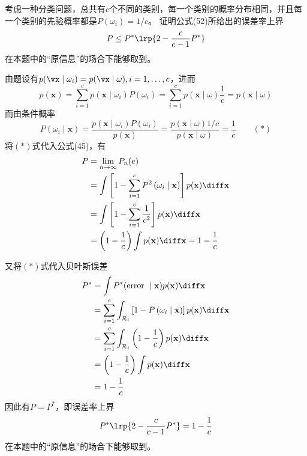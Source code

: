 \documentclass[reportComp]{thesis}
\begin{document}
\begin{question}[\textsection 4 Q17]
考虑一种分类问题，总共有$c$个不同的类别，每一个类别的概率分布相同，并且每一个类别的先验概率都是$P(\omega_i)=1/c$。
证明公式(52)所给出的误差率上界
\[P\leq P^*\lrp{2-\frac{c}{c-1}P^*}\]
在本题中的“原信息”的场合下能够取到。
\end{question}
\begin{answer}
由题设有$p(\vx\mid\omega_i)=p(\vx\mid\omega),i=1,\ldots,c$，进而
\[p(\mathbf{x})=\sum_{i=1}^{c} p\left(\mathbf{x} \mid \omega_{i}\right) P\left(\omega_{i}\right)=\sum_{i=1}^{c} p(\mathbf{x} \mid \omega) \frac{1}{c}=p(\mathbf{x} \mid \omega)\]
而由条件概率
\[P\left(\omega_{i} \mid \mathbf{x}\right)=\frac{p\left(\mathbf{x} \mid \omega_{i}\right) P\left(\omega_{i}\right)}{p(\mathbf{x})}=\frac{p(\mathbf{x} \mid \omega) 1 / c}{p(\mathbf{x} \mid \omega)}=\frac{1}{c}\qquad(*)\]
将$(*)$式代入公式(45)，有
\[\begin{aligned}
P &=\lim _{n \rightarrow \infty} P_{n}(e) \\
&=\int\left[1-\sum_{i=1}^{c} P^{2}\left(\omega_{i} \mid \mathbf{x}\right)\right] p(\mathbf{x}) \diff \mathbf{x} \\
&=\int\left[1-\sum_{i=1}^{c} \frac{1}{c^{2}}\right] p(\mathbf{x}) \diff \mathbf{x} \\
&=\left(1-\frac{1}{c}\right) \int p(\mathbf{x}) \diff \mathbf{x}=1-\frac{1}{c}
\end{aligned}\]

又将$(*)$式代入贝叶斯误差
\[\begin{aligned}
P^{*} &=\int P^{*}(\text {error } \mid \mathbf{x}) p(\mathbf{x}) \diff \mathbf{x} \\
&=\sum_{i=1}^{c} \int_{\mathcal{R}_{i}}\left[1-P\left(\omega_{i} \mid \mathbf{x}\right)\right] p(\mathbf{x}) \diff \mathbf{x}\\
&=\sum_{i=1}^{c} \int_{\mathcal{R}_{i}}\left(1-\frac{1}{c}\right) p(\mathbf{x}) \diff \mathbf{x}\\
&=\left(1-\frac{1}{c}\right) \int p(\mathbf{x}) \diff \mathbf{x}\\
&=1-\frac{1}{c}
\end{aligned}\]
因此有$P=P^*$，即误差率上界
\[P^*\lrp{2-\frac{c}{c-1}P^*}=1-\frac{1}{c}\]
在本题中的“原信息”的场合下能够取到。
\end{answer}
\end{document}

